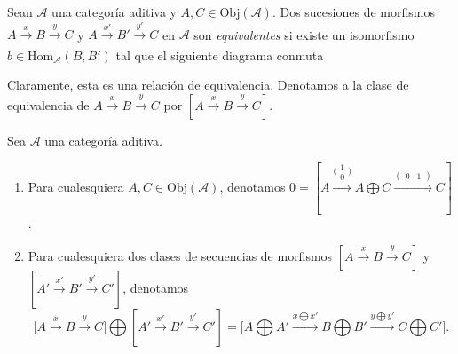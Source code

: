 \documentclass[tesis]{subfiles}
\begin{document}
\begin{Def}\cite[Definition 2.7]{NakaokaPalu}\label{NakaokaPalu-2.7}
    Sean $\mathscr{A}$ una categoría aditiva y $A,C\in\text{Obj}(\mathscr{A})$. Dos sucesiones de morfismos $A\xrightarrow[]{x}B\xrightarrow[]{y}C$ y $A\xrightarrow[]{x'}B'\xrightarrow[]{y'}C$ en $\mathscr{A}$ son \emph{equivalentes} si existe un isomorfismo $b\in\text{Hom}_\mathscr{A}(B,B')$ tal que el siguiente diagrama conmuta
    \begin{center}
    \end{center}
    Claramente, esta es una relación de equivalencia. Denotamos a la clase de equivalencia de $A\xrightarrow[]{x}B\xrightarrow[]{y}C$ por $[A\xrightarrow[]{x}B\xrightarrow[]{y}C]$.
\end{Def}

\begin{Def}\cite[Definition 2.8]{NakaokaPalu}\label{NakaokaPalu-2.8}
    Sea $\mathscr{A}$ una categoría aditiva. \leavevmode
    \begin{enumerate}[label=(\alph*)]
        \item Para cualesquiera $A,C\in\text{Obj}(\mathscr{A})$, denotamos $0 = [A\xrightarrow[]{\big(\begin{smallmatrix} 1 \\ 0 \end{smallmatrix}\big)} A\bigoplus C \xrightarrow[]{(\begin{smallmatrix} 0 &1 \end{smallmatrix})} C]$.

        \item Para cualesquiera dos clases de secuencias de morfismos $[A\xrightarrow[]{x}B\xrightarrow[]{y}C]$ y $[A'\xrightarrow[]{x'}B'\xrightarrow[]{y'}C']$, denotamos
            \[
            \big[A\xrightarrow[]{x}B\xrightarrow[]{y}C]\bigoplus[A'\xrightarrow[]{x'}B'\xrightarrow[]{y'}C'] = [A\bigoplus A'\xrightarrow[]{x\bigoplus x'} B\bigoplus B' \xrightarrow[]{y\bigoplus y'} C\bigoplus C'\big].
            \] 
            
    \end{enumerate}
\end{Def}
\end{document}
